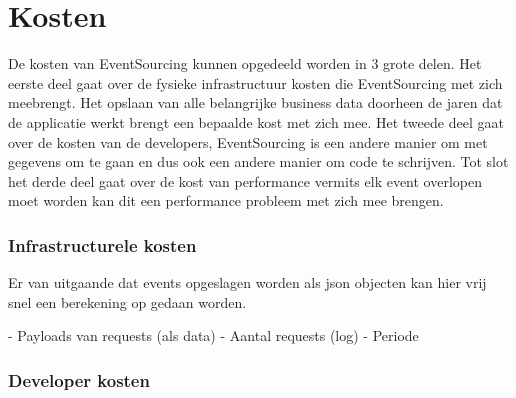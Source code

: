 
\chapter{Kosten}
\label{ch:kosten}

De kosten van EventSourcing kunnen opgedeeld worden in 3 grote delen. Het eerste deel gaat over de fysieke infrastructuur kosten die EventSourcing met zich meebrengt. Het opslaan van alle belangrijke business data doorheen de jaren dat de applicatie werkt brengt een bepaalde kost met zich mee. Het tweede deel gaat over de kosten van de developers, EventSourcing is een andere manier om met gegevens om te gaan en dus ook een andere manier om code te schrijven. Tot slot het derde deel gaat over de kost van performance vermits elk event overlopen moet worden kan dit een performance probleem met zich mee brengen.

\subsection{Infrastructurele kosten}
\label{subsec:infrastructurele-kosten}

Er van uitgaande dat events opgeslagen worden als json objecten kan hier vrij snel een berekening op gedaan worden.



- Payloads van requests (als data)
- Aantal requests (log)
- Periode

\subsection{Developer kosten}
\label{subsec:developer-kosten}
